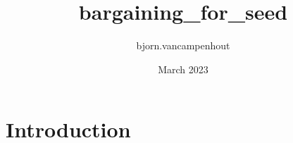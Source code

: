 \documentclass{article}
\title{bargaining_for_seed}
\author{bjorn.vancampenhout }
\date{March 2023}
\begin{document}
\maketitle

\section{Introduction}
\end{document}
